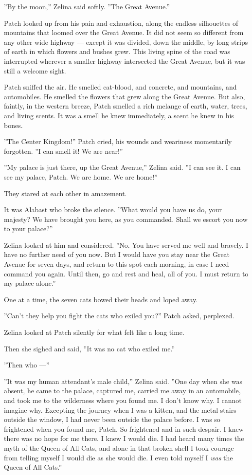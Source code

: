 \documentclass[12pt]{book}
\begin{document}
''By the moon,'' Zelina said softly. ''The Great Avenue.''

Patch looked up from his pain and exhaustion, along the endless
silhouettes of mountains that loomed over the Great Avenue. It did not
seem so different from any other wide highway --- except it was
divided, down the middle, by long strips of earth in which flowers and
bushes grew. This living spine of the road was interrupted wherever a
smaller highway intersected the Great Avenue, but it was still a
welcome sight.

Patch sniffed the air. He smelled cat-blood, and concrete, and
mountains, and automobiles. He smelled the flowers that grew along the
Great Avenue. But also, faintly, in the western breeze, Patch smelled
a rich melange of earth, water, trees, and living scents. It was a
smell he knew immediately, a scent he knew in his bones.

''The Center Kingdom!'' Patch cried, his wounds and weariness
momentarily forgotten. ''I can smell it! We are near!''

''My palace is just there, up the Great Avenue,'' Zelina said. ''I can
see it. I can see my palace, Patch. We are home. We are home!''

They stared at each other in amazement.

It was Alabast who broke the silence. ''What would you have us do,
your majesty? We have brought you here, as you commanded. Shall we
escort you now to your palace?''

Zelina looked at him and considered. ''No. You have served me well and
bravely. I have no further need of you now. But I would have you stay
near the Great Avenue for seven days, and return to this spot each
morning, in case I need command you again. Until then, go and rest and
heal, all of you. I must return to my palace alone.''

One at a time, the seven cats bowed their heads and loped away.

''Can't they help you fight the cats who exiled you?'' Patch asked,
perplexed.

Zelina looked at Patch silently for what felt like a long time.

Then she sighed and said, ''It was no cat who exiled me.''

''Then who ---''

''It was my human attendant's male child,'' Zelina said. ''One day
when she was absent, he came to the palace, captured me, carried me
away in an automobile, and took me to the wilderness where you found
me. I don't know why. I cannot imagine why. Excepting the journey when
I was a kitten, and the metal stairs outside the window, I had never
been outside the palace before. I was so frightened when you found me,
Patch. So frightened and in such despair. I knew there was no hope for
me there. I knew I would die. I had heard many times the myth of the
Queen of All Cats, and alone in that broken shell I took courage from
telling myself I would die as she would die. I even told myself I
\textit{was} the Queen of All Cats.''
\end{document}
